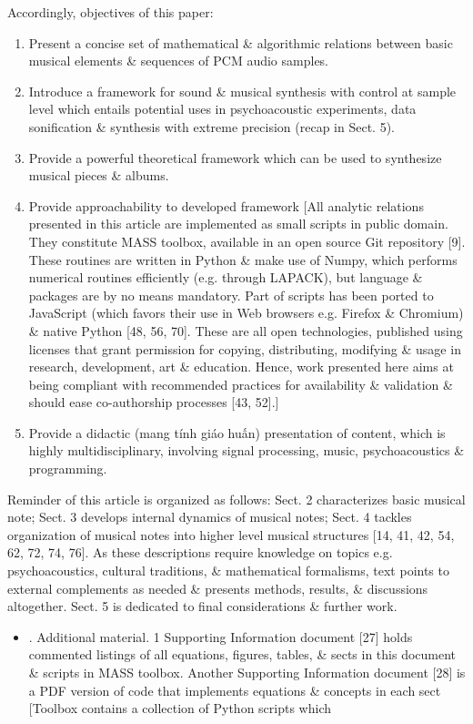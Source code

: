 \documentclass{article}
\begin{document}
\begin{itemize}
	Accordingly, objectives of this paper:
	\begin{enumerate}
		\item Present a concise set of mathematical \& algorithmic relations between basic musical elements \& sequences of PCM audio samples.
		\item Introduce a framework for sound \& musical synthesis with control at sample level which entails potential uses in psychoacoustic experiments, data sonification \& synthesis with extreme precision (recap in Sect. 5).
		\item Provide a powerful theoretical framework which can be used to synthesize musical pieces \& albums.
		\item Provide approachability to developed framework [All analytic relations presented in this article are implemented as small scripts in public domain. They constitute MASS toolbox, available in an open source Git repository [9]. These routines are written in Python \& make use of Numpy, which performs numerical routines efficiently (e.g. through LAPACK), but language \& packages are by no means mandatory. Part of scripts has been ported to JavaScript (which favors their use in Web browsers e.g. Firefox \& Chromium) \& native Python [48, 56, 70]. These are all open technologies, published using licenses that grant permission for copying, distributing, modifying \& usage in research, development, art \& education. Hence, work presented here aims at being compliant with recommended practices for availability \& validation \& should ease co-authorship processes [43, 52].]
		\item Provide a didactic (mang tính giáo huấn) presentation of content, which is highly multidisciplinary, involving signal processing, music, psychoacoustics \& programming.
	\end{enumerate}
	Reminder of this article is organized as follows: Sect. 2 characterizes basic musical note; Sect. 3 develops internal dynamics of musical notes; Sect. 4 tackles organization of musical notes into higher level musical structures [14, 41, 42, 54, 62, 72, 74, 76]. As these descriptions require knowledge on topics e.g. psychoacoustics, cultural traditions, \& mathematical formalisms, text points to external complements as needed \& presents methods, results, \& discussions altogether. Sect. 5 is dedicated to final considerations \& further work.	
	\begin{itemize}
		\item {. Additional material.} 1 Supporting Information document [27] holds commented listings of all equations, figures, tables, \& sects in this document \& scripts in MASS toolbox. Another Supporting Information document [28] is a PDF version of code that implements equations \& concepts in each sect [Toolbox contains a collection of Python scripts which

\end{itemize}
\end{itemize}
\end{document}
